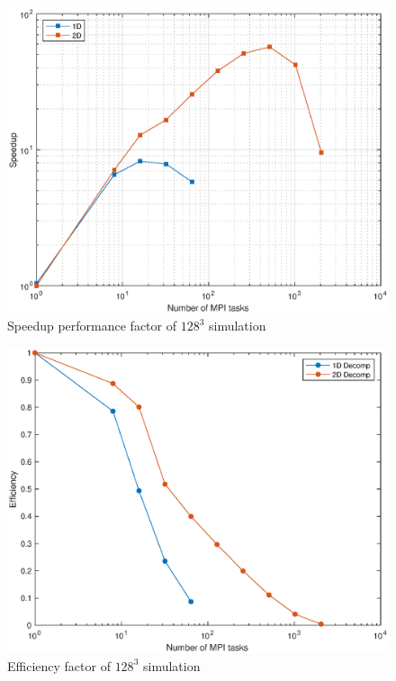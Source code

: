\begin{figure}
\begin{center}
\includegraphics[scale=0.55]{grafici/642}
\caption{Speedup performance factor of $128^3$ simulation}
\label{642}
\end{center}
\end{figure}

\begin{figure}
\begin{center}
\includegraphics[scale=0.55]{grafici/644}
\caption{Efficiency factor of $128^3$ simulation}
\label{644}
\end{center}
\end{figure}
